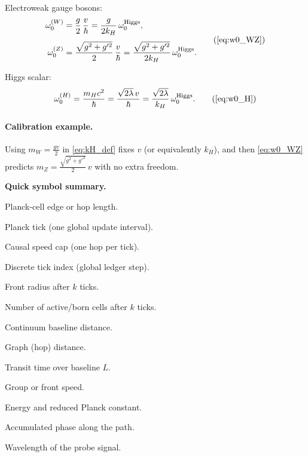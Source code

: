 Electroweak gauge bosons:
\[
\begin{aligned}
  \omega_0^{(W)} &= \frac{g}{2}\,\frac{v}{\hbar}
                  = \frac{g}{2k_H}\,\omega_0^{\mathrm{Higgs}},\\[4pt]
  \omega_0^{(Z)} &= \frac{\sqrt{g^2+g'^2}}{2}\,\frac{v}{\hbar}
                  = \frac{\sqrt{g^2+g'^2}}{2k_H}\,\omega_0^{\mathrm{Higgs}}.
\end{aligned}
\tag{\ref{eq:w0_WZ}}
\]

Higgs scalar:
\[
  \omega_0^{(H)} = \frac{m_H c^2}{\hbar}
                 = \frac{\sqrt{2\lambda}\,v}{\hbar}
                 = \frac{\sqrt{2\lambda}}{k_H}\,\omega_0^{\mathrm{Higgs}}.
  \tag{\ref{eq:w0_H}}
\]

\paragraph{Calibration example.}  
Using \(m_W = \tfrac{g v}{2}\) in \eqref{eq:kH_def} fixes \(v\) (or equivalently \(k_H\)), and then \eqref{eq:w0_WZ} predicts \(m_Z = \tfrac{\sqrt{g^2+g'^2}}{2}\,v\) with no extra freedom.

\bigskip
\noindent\textbf{Quick symbol summary.}
\begin{description}[leftmargin=2.4em,labelsep=0.8em]
  \item[\(\ell_P\)] Planck-cell edge or hop length.
  \item[\(t_P\)] Planck tick (one global update interval).
  \item[\(c=\ell_P/t_P\)] Causal speed cap (one hop per tick).
  \item[\(k\)] Discrete tick index (global ledger step).
  \item[\(R(k)\)] Front radius after \(k\) ticks.
  \item[\(N(k)\)] Number of active/born cells after \(k\) ticks.
  \item[\(L\)] Continuum baseline distance.
  \item[\(d_G\)] Graph (hop) distance.
  \item[\(T(L)\)] Transit time over baseline \(L\).
  \item[\(v_g\)] Group or front speed.
  \item[\(E,\,\hbar\)] Energy and reduced Planck constant.
  \item[\(\Delta\phi\)] Accumulated phase along the path.
  \item[\(\lambda\)] Wavelength of the probe signal.
\end{description}
